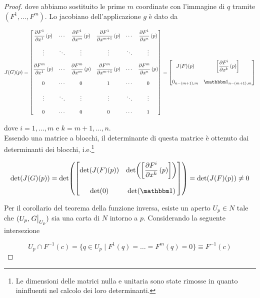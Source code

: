 \begin{proof}
	dove abbiamo sostituito le prime $ m $ coordinate con l'immagine di $ q $ tramite $ (F^{1},\dots,F^{m}) $. Lo jacobiano dell'applicazione $ g $ è dato da
	
	\begin{equation}
		J(G)(p) = %
		\bmqty{ %
			\dpdv{F^{1}}{x^{1}} \, (p) & \cdots & \dpdv{F^{1}}{x^{m}} \, (p) & \dpdv{F^{1}}{x^{m+1}} \, (p) & \cdots & \dpdv{F^{1}}{x^{n}} \, (p) \\ \\ %
			\vdots & \ddots & \vdots & \vdots & \ddots & \vdots \\ \\ %
			\dpdv{F^{m}}{x^{1}} \, (p) & \cdots & \dpdv{F^{m}}{x^{m}} \, (p) & \dpdv{F^{m}}{x^{m+1}} \, (p) & \cdots & \dpdv{F^{m}}{x^{n}} \, (p) \\ \\ %
			0 & \cdots & 0 & 1 & \cdots & 0 \\ \\ %
			\vdots & \ddots & \vdots & \vdots & \ddots & \vdots \\ \\ %
			0 & \cdots & 0 & 0 & \cdots & 1 %
		 } %
	 	= \bmqty{ %
	 		J(F)(p) & \left[ \dpdv{F^{i}}{x^{k}} \, (p) \right] \\ \\ %
	 		0_{n-(m+1),m} & \bigone_{n-(m+1),m} %
	 		}
	\end{equation}

	dove $ i=1,\dots,m $ e $ k=m+1,\dots,n $. \\
	Essendo una matrice a blocchi, il determinante di questa matrice è ottenuto dai determinanti dei blocchi, i.e.\footnote{%
		Le dimensioni delle matrici nulla e unitaria sono state rimosse in quanto ininfluenti nel calcolo dei loro determinanti.%
	}
	
	\begin{equation}
		\det(J(G)(p)) = %
		\det ( \bmqty{ %
			\det( J(F)(p) ) & \det( \left[ \dpdv{F^{i}}{x^{k}} \, (p) \right] ) \\ \\ %
			\det( 0 ) & \det( \bigone ) %
			} ) %
		= \det( J(F)(p) ) \neq 0
	\end{equation}

	Per il corollario del teorema della funzione inversa, esiste un aperto $ U_{p} \in N $ tale che $ (U_{p},\eval{G}_{U_{p}}) $ sia una carta di $ N $ intorno a $ p $. Considerando la seguente intersezione
	
	\begin{equation}
		U_{p} \cap F^{-1}(c) = \{ q \in U_{p} \mid F^{1}(q) = \dots = F^{m}(q) = 0 \} \equiv F^{-1}(c)
	\end{equation}


\end{proof}
